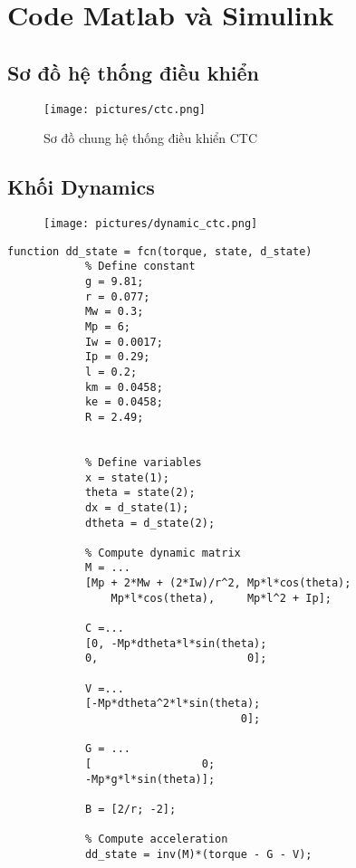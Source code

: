\chapter{Code Matlab và Simulink}
    \section{Sơ đồ hệ thống điều khiển}
    \begin{figure}[H]
        \centering
        \texttt{[image: pictures/ctc.png]}
        \caption{Sơ đồ chung hệ thống điều khiển CTC}
    \end{figure}

    \section{Khối Dynamics}
    \begin{figure}[H]
        \centering
        \texttt{[image: pictures/dynamic\_ctc.png]}
    \end{figure}
    \begin{lstlisting}[caption={Code khối Dynamic Block}, label={lst:pz}]
        function dd_state = fcn(torque, state, d_state)
            % Define constant
            g = 9.81;
            r = 0.077;
            Mw = 0.3;
            Mp = 6;
            Iw = 0.0017;
            Ip = 0.29;
            l = 0.2;
            km = 0.0458;
            ke = 0.0458;
            R = 2.49;
        
        
            % Define variables
            x = state(1);
            theta = state(2);
            dx = d_state(1);
            dtheta = d_state(2);
    
            % Compute dynamic matrix
            M = ... 
            [Mp + 2*Mw + (2*Iw)/r^2, Mp*l*cos(theta);
                Mp*l*cos(theta),     Mp*l^2 + Ip];
            
            C =... 
            [0, -Mp*dtheta*l*sin(theta);
            0,                       0];
            
            V =... 
            [-Mp*dtheta^2*l*sin(theta);
                                    0];
            
            G = ...
            [                 0;
            -Mp*g*l*sin(theta)];
            
            B = [2/r; -2];
            
            % Compute acceleration
            dd_state = inv(M)*(torque - G - V); 
    \end{lstlisting}



